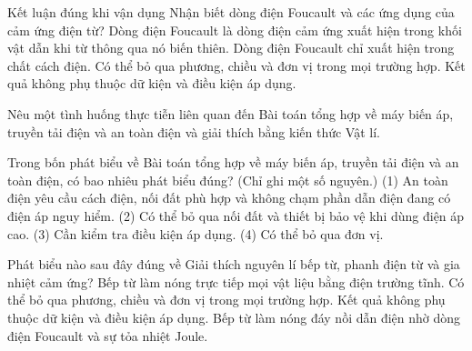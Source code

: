 \begin{ex}
Kết luận đúng khi vận dụng Nhận biết dòng điện Foucault và các ứng dụng của cảm ứng điện từ?
\choice
{\True Dòng điện Foucault là dòng điện cảm ứng xuất hiện trong khối vật dẫn khi từ thông qua nó biến thiên.}
{Dòng điện Foucault chỉ xuất hiện trong chất cách điện.}
{Có thể bỏ qua phương, chiều và đơn vị trong mọi trường hợp.}
{Kết quả không phụ thuộc dữ kiện và điều kiện áp dụng.}
\end{ex}

\begin{bt}
Nêu một tình huống thực tiễn liên quan đến Bài toán tổng hợp về máy biến áp, truyền tải điện và an toàn điện và giải thích bằng kiến thức Vật lí.
\end{bt}

\begin{ex}
Trong bốn phát biểu về Bài toán tổng hợp về máy biến áp, truyền tải điện và an toàn điện, có bao nhiêu phát biểu đúng? (Chỉ ghi một số nguyên.) (1) An toàn điện yêu cầu cách điện, nối đất phù hợp và không chạm phần dẫn điện đang có điện áp nguy hiểm. (2) Có thể bỏ qua nối đất và thiết bị bảo vệ khi dùng điện áp cao. (3) Cần kiểm tra điều kiện áp dụng. (4) Có thể bỏ qua đơn vị.
\end{ex}

\begin{ex}
Phát biểu nào sau đây đúng về Giải thích nguyên lí bếp từ, phanh điện từ và gia nhiệt cảm ứng?
\choice
{Bếp từ làm nóng trực tiếp mọi vật liệu bằng điện trường tĩnh.}
{Có thể bỏ qua phương, chiều và đơn vị trong mọi trường hợp.}
{Kết quả không phụ thuộc dữ kiện và điều kiện áp dụng.}
{\True Bếp từ làm nóng đáy nồi dẫn điện nhờ dòng điện Foucault và sự tỏa nhiệt Joule.}
\end{ex}

